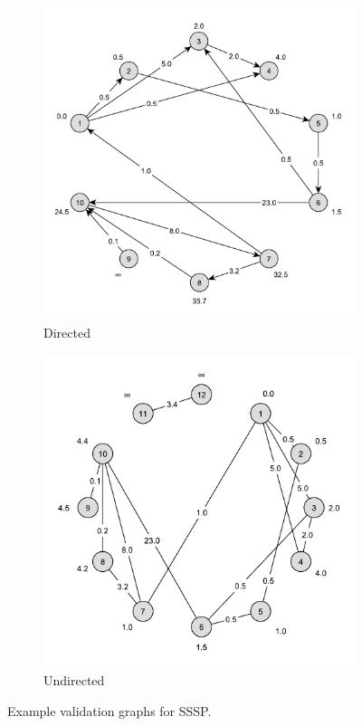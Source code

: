 \begin{figure}[h]
	\centering
	\begin{subfigure}{0.496\textwidth}
		\centering
		\includegraphics[scale=\examplescale]{figures/examples/sssp-dir.pdf}
		\caption{Directed}
	\end{subfigure}
	\begin{subfigure}{0.496\textwidth}
		\centering
		\includegraphics[scale=\examplescale]{figures/examples/sssp-undir.pdf}
		\caption{Undirected}
	\end{subfigure}
	\caption{Example validation graphs for SSSP.}
	\label{fig:sssp_example}
\end{figure}

